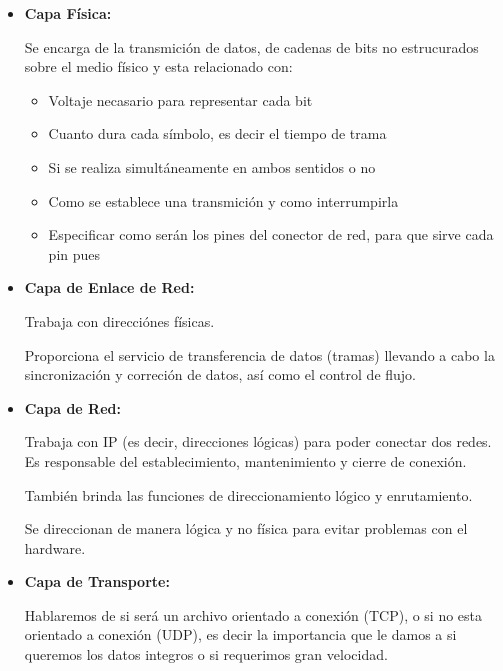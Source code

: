 \documentclass[12pt, fleqn]{report}                             %
\theoremstyle{break}                                            %
\begin{document}
            \begin{itemize}
                
                \item \textbf{Capa Física:} 

                    Se encarga de la transmición de datos, de cadenas de bits no estrucurados sobre
                    el medio físico y esta relacionado con:
                    \begin{itemize}
                        \item Voltaje necasario para representar cada bit
                        \item Cuanto dura cada símbolo, es decir el tiempo de trama
                        \item Si se realiza simultáneamente en ambos sentidos o no
                        \item Como se establece una transmición y como interrumpirla
                        \item Especificar como serán los pines del conector de red, para que sirve
                            cada pin pues
                    \end{itemize}

                \item \textbf{Capa de Enlace de Red:} 

                    Trabaja con direcciónes físicas.

                    Proporciona el servicio de transferencia de datos (tramas) llevando a cabo
                    la sincronización y correción de datos, así como el control de flujo.

                \item \textbf{Capa de Red:}

                    Trabaja con IP (es decir, direcciones lógicas) para poder conectar dos redes. 
                    Es responsable del establecimiento, mantenimiento y cierre de conexión.

                    También brinda las funciones de direccionamiento lógico y enrutamiento.

                    Se direccionan de manera lógica y no física para evitar problemas con el hardware.

                \item \textbf{Capa de Transporte:}

                    Hablaremos de si será un archivo orientado a conexión (TCP), o si no esta orientado
                    a conexión (UDP), es decir la importancia que le damos a si queremos los datos integros
                    o si requerimos gran velocidad.


\end{itemize}
\end{document}
